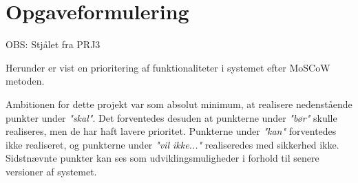 \chapter{Opgaveformulering}
\label{ch:Opgaveformulering}


OBS: Stjålet fra PRJ3

Herunder er vist en prioritering af funktionaliteter i systemet efter MoSCoW metoden. 

Ambitionen for dette projekt var som absolut minimum, at realisere nedenstående punkter under \textit{"skal"}. 
Det forventedes desuden at punkterne under \textit{"bør"} skulle realiseres, men de har haft lavere prioritet.
Punkterne under \textit{"kan"} forventedes ikke realiseret, og punkterne under \textit{"vil ikke..."} realiseredes med sikkerhed ikke. 
Sidstnævnte punkter kan ses som udviklingsmuligheder i forhold til senere versioner af systemet. 


